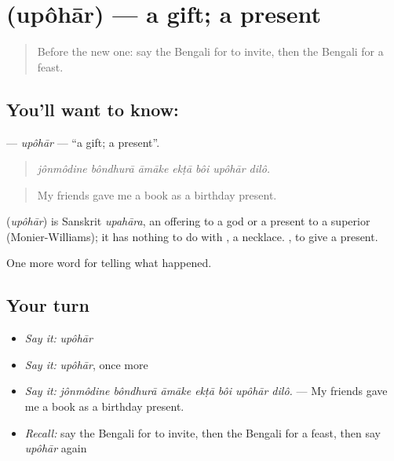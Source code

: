 \section[\texorpdfstring{\bn{উপহার} (upôhār)}{উপহার (upôhār)}]{ (upôhār) — a gift; a present}

\label{lesson:BN-C306-upohar}



\begin{quote}
Before the new one: say the Bengali for to invite, then the Bengali for a feast.
\end{quote}

\subsection*{You'll want to know: }
\textbf{} — \emph{upôhār} — \textquotedblleft{}a gift; a present\textquotedblright{}.

\begin{quote}
      
\end{quote}

\begin{quote}
\emph{jônmôdine bôndhurā āmāke ekṭā bôi upôhār dilô.}
\end{quote}

\begin{quote}
My friends gave me a book as a birthday present.
\end{quote}

\begin{cousinweb}
\textbf{} (\emph{upôhār}) is Sanskrit \emph{upahāra}, an offering to a god or a present to a superior (Monier-Williams); it has nothing to do with \textbf{}, a necklace.  , to give a present.
\end{cousinweb}

\begin{grammarlens}[title={What you've built}]
One more word for telling what happened.
\end{grammarlens}

\subsection*{Your turn}
\begin{itemize}
\raggedright
  \item \emph{Say it:} \emph{upôhār}
  \item \emph{Say it:} \emph{upôhār}, once more
  \item \emph{Say it:} \emph{jônmôdine bôndhurā āmāke ekṭā bôi upôhār dilô.} — My friends gave me a book as a birthday present.
  \item \emph{Recall:} say the Bengali for to invite, then the Bengali for a feast, then say \emph{upôhār} again
\end{itemize}

